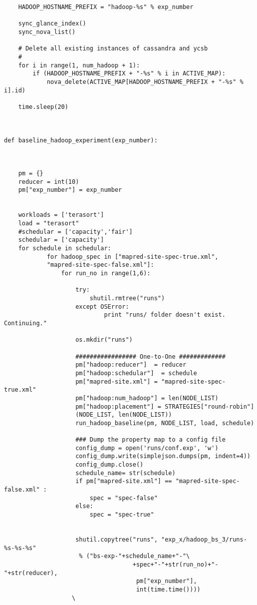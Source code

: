 \begin{verbatim}
    HADOOP_HOSTNAME_PREFIX = "hadoop-%s" % exp_number

    sync_glance_index()
    sync_nova_list()

    # Delete all existing instances of cassandra and ycsb
    #
    for i in range(1, num_hadoop + 1):
        if (HADOOP_HOSTNAME_PREFIX + "-%s" % i in ACTIVE_MAP):
            nova_delete(ACTIVE_MAP[HADOOP_HOSTNAME_PREFIX + "-%s" % i].id)

    time.sleep(20)



def baseline_hadoop_experiment(exp_number):
    

    
    pm = {}
    reducer = int(10)
    pm["exp_number"] = exp_number
    

    workloads = ['terasort']
    load = "terasort"
    #schedular = ['capacity','fair']
    schedular = ['capacity']
    for schedule in schedular:     
    	    for hadoop_spec in ["mapred-site-spec-true.xml",
            "mapred-site-spec-false.xml"]:
                for run_no in range(1,6):

                    try:
                        shutil.rmtree("runs")
                    except OSError:
                            print "runs/ folder doesn't exist. Continuing."

                    os.mkdir("runs")
 
                    ################# One-to-One #############
                    pm["hadoop:reducer"]  = reducer
                    pm["hadoop:schedular"]  = schedule
                    pm["mapred-site.xml"] = "mapred-site-spec-true.xml"
                    pm["hadoop:num_hadoop"] = len(NODE_LIST)
                    pm["hadoop:placement"] = STRATEGIES["round-robin"]
                    (NODE_LIST, len(NODE_LIST))
                    run_hadoop_baseline(pm, NODE_LIST, load, schedule)

                    ### Dump the property map to a config file
                    config_dump = open('runs/conf.exp', 'w')
                    config_dump.write(simplejson.dumps(pm, indent=4))
                    config_dump.close()
                    schedule_name= str(schedule)
                    if pm["mapred-site.xml"] == "mapred-site-spec-false.xml" :
                        spec = "spec-false"
                    else:
                        spec = "spec-true"


                    shutil.copytree("runs", "exp_x/hadoop_bs_3/runs-%s-%s-%s"
                     % ("bs-exp-"+schedule_name+"-"\
                                    +spec+"-"+str(run_no)+"-"+str(reducer),
                                     pm["exp_number"],
                                     int(time.time())))
                   \



\end{verbatim}
